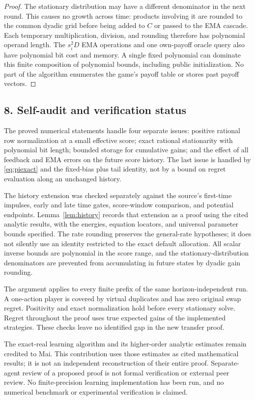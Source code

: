 \documentclass[11pt]{article}
\begin{document}
\begin{proof}
The stationary distribution may have a different denominator in the
next round.  This causes no growth across time: products involving it
are rounded to the common dyadic grid before being added to $C$ or
passed to the EMA cascade.  Each temporary multiplication, division,
and rounding therefore has polynomial operand length.  The $
s_i^2D$ EMA operations and one own-payoff oracle query also have
polynomial bit cost and memory.  A single fixed polynomial can
dominate this finite composition of polynomial bounds, including
public initialization.  No part of the algorithm enumerates the
game's payoff table or stores past payoff vectors.
\end{proof}

\subsection*{8. Self-audit and verification status}
The proved numerical statements handle four separate issues:
positive rational row normalization at a small effective score;
exact rational stationarity with polynomial bit length;
bounded storage for cumulative gains; and the effect of all
feedback and EMA errors on the future score history.  The last issue
is handled by \eqref{eq:piexact} and the fixed-bias plus tail identity,
not by a bound on regret evaluation along an unchanged history.

The history extension was checked separately against the source's
first-time impulses, early and late time gates, score-window
comparison, and potential endpoints.  Lemma~\ref{lem:history}
records that extension as a proof using the cited analytic results,
with the energies, equation locators, and universal parameter bounds
specified.  The rate rounding preserves the general-rate hypotheses;
it does not silently use an identity restricted to the exact default
allocation.  All scalar inverse bounds are polynomial in the score
range, and the stationary-distribution denominators are prevented
from accumulating in future states by dyadic gain rounding.

The argument applies to every finite prefix of the same
horizon-independent run.  A one-action player is covered by virtual
duplicates and has zero original swap regret.  Positivity and exact
normalization hold before every stationary solve.  Regret throughout
the proof uses true expected gains of the implemented strategies.
These checks leave no identified gap in the new transfer proof.

The exact-real learning algorithm and its higher-order analytic
estimates remain credited to Mai.  This contribution uses those
estimates as cited mathematical results; it is not an independent
reconstruction of their entire proof.  Separate-agent review of a
proposed proof is not formal verification or external peer review.
No finite-precision learning implementation has been run, and no
numerical benchmark or experimental verification is claimed.
\end{document}
